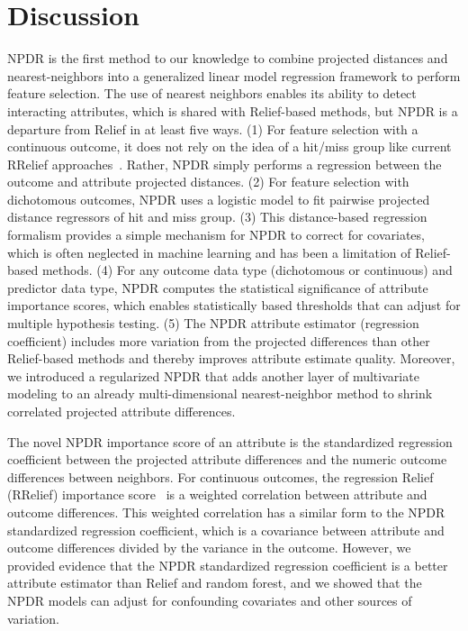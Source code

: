 \documentclass{bioinfo}
\begin{document}
\section{Discussion}
NPDR is the first method to our knowledge to combine projected distances and nearest-neighbors into a generalized linear model regression framework to perform feature selection.
The use of nearest neighbors enables its ability to detect interacting attributes, which is shared with Relief-based methods, but NPDR is a departure from Relief in at least five ways.
(1) For feature selection with a continuous outcome, it does not rely on the idea of a hit/miss group like current RRelief approaches~\cite{urbanowicz17}.
Rather, NPDR simply performs a regression between the outcome and attribute projected distances.
(2) For feature selection with dichotomous outcomes, NPDR uses a logistic model to fit pairwise projected distance regressors of hit and miss group.
(3) This distance-based regression formalism provides a simple mechanism for NPDR to correct for covariates, which is often neglected in machine learning and has been a limitation of Relief-based methods.
(4) For any outcome data type (dichotomous or continuous) and predictor data type, NPDR computes the statistical significance of attribute importance scores, which enables statistically based thresholds that can adjust for multiple hypothesis testing.
(5) The NPDR attribute estimator (regression coefficient) includes more variation from the projected differences than other Relief-based methods and thereby improves attribute estimate quality.
Moreover, we introduced a regularized NPDR that adds another layer of multivariate modeling to an already multi-dimensional nearest-neighbor method to shrink correlated projected attribute differences.

The novel NPDR importance score of an attribute is the standardized regression coefficient between the projected attribute differences and the numeric outcome differences between neighbors.
For continuous outcomes, the regression Relief (RRelief) importance score~\cite{robnik03} is a weighted correlation between attribute and outcome differences. This weighted correlation has a similar form to the NPDR standardized regression coefficient, which is a covariance between attribute and outcome differences divided by the variance in the outcome.
However, we provided evidence that the NPDR standardized regression coefficient is a better attribute estimator than Relief and random forest, and we showed that the NPDR models can adjust for confounding covariates and other sources of variation.
\end{document}

